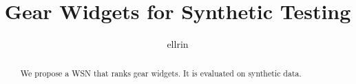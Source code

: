 \documentclass{article}
\begin{document}
\title{Gear Widgets for Synthetic Testing}
\author{ellrin}
\maketitle

\begin{abstract}
We propose a WSN that ranks gear widgets.
It is evaluated on synthetic data.
\end{abstract}




\end{document}

